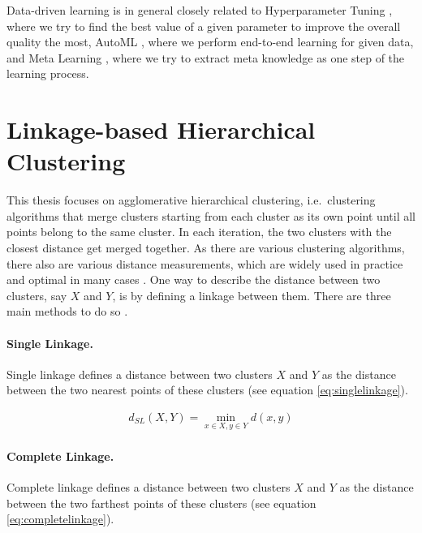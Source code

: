 Data-driven learning is in general closely related to Hyperparameter Tuning \cite{hutter2015beyond}, where we try to find the best value of a given parameter to improve the overall quality the most, AutoML \cite{lacoste2014sequential,liu2018very}, where we perform end-to-end learning for given data, and Meta Learning \cite{alexandros2001model}, where we try to extract meta knowledge as one step of the learning process.

\section{Linkage-based Hierarchical Clustering}

This thesis focuses on agglomerative hierarchical clustering, i.e.\ clustering algorithms that merge clusters starting from each cluster as its own point until all points belong to the same cluster. In each iteration, the two clusters with the closest distance get merged together. As there are various clustering algorithms, there also are various distance measurements, which are widely used in practice and optimal in many cases \cite{awasthi2017local,saeed2003software,white2010alignment,awasthi2012center,balcan2016clustering,grosswendt2017improved}. One way to describe the distance between two clusters, say $X$ and $Y$, is by defining a linkage between them. There are three main methods to do so \cite{Manning:2008:IIR:1394399}.

\paragraph{Single Linkage.}

Single linkage defines a distance between two clusters $X$ and $Y$ as the distance between the two nearest points of these clusters (see equation \ref{eq:singlelinkage}).

\begin{equation}
    \begin{aligned}
        d_{SL}(X,Y) = \min\limits_{x \in X, y \in Y} d(x,y)
    \end{aligned}
    \label{eq:singlelinkage}
\end{equation}

\paragraph{Complete Linkage.}

Complete linkage defines a distance between two clusters $X$ and $Y$ as the distance between the two farthest points of these clusters (see equation \ref{eq:completelinkage}).

